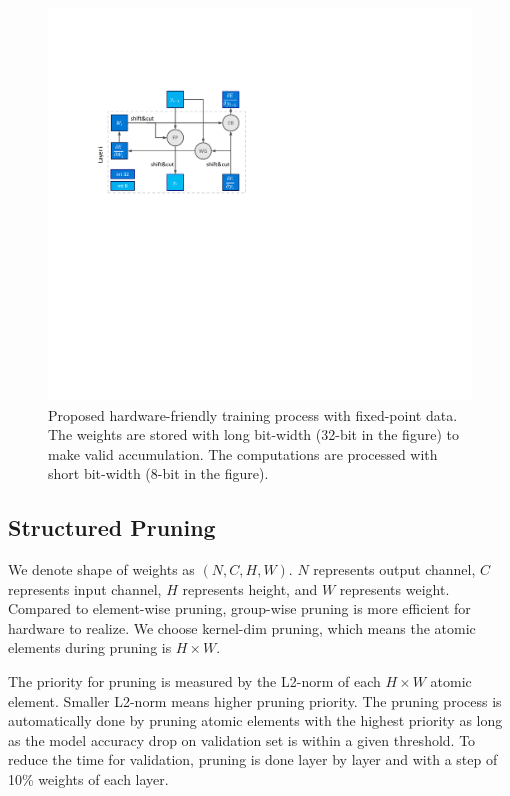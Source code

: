 \begin{figure}[tb]
  \centering 
  \includegraphics[width=0.9\columnwidth]{figures/fixed_train.pdf}
  \caption{Proposed hardware-friendly training process with fixed-point data. The weights are stored with long bit-width (32-bit in the figure) to make valid accumulation. The computations are processed with short bit-width (8-bit in the figure).}
  \label{fig:fixed_train}
\end{figure}

\subsection{Structured Pruning}

We denote shape of weights as $(N, C, H, W)$. $N$ represents output channel, $C$ represents input channel, $H$ represents height, and $W$ represents weight. Compared to element-wise pruning, group-wise pruning is more efficient for hardware to realize. We choose kernel-dim pruning, which means the atomic elements during pruning is $H \times W$. 

The priority for pruning is measured by the L2-norm of each $H \times W$ atomic element. Smaller L2-norm means higher pruning priority. The pruning process is automatically done by pruning atomic elements with the highest priority as long as the model accuracy drop on validation set is within a given threshold. To reduce the time for validation, pruning is done layer by layer and with a step of 10\% weights of each layer.

